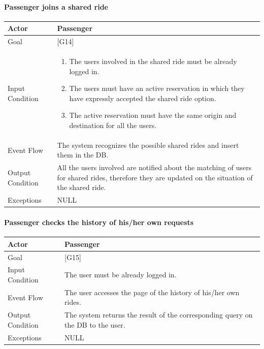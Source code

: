 \documentclass[a4paper,11pt]{report} %
\begin{document}
	\pagebreak
	
	\paragraph{Passenger joins a shared ride}
	\begin{center}
		\begin{tabular}{| l | p{9cm} |}\hline
			Actor & Passenger\\\hline
			Goal & {[}G14{]} \\\hline
			Input Condition & \begin{enumerate}
				\item The users involved in the shared ride must be already logged in.
				\item The users must have an active reservation in which they have expressly accepted the shared ride option.
				\item The active reservation must have the same origin and destination for all the users.
			\end{enumerate}\\\hline
			Event Flow & The system recognizes the possible shared rides and insert them in the DB.\\\hline
			Output Condition & All the users involved are notified about the matching of users for shared rides, therefore they are updated on the situation of the shared ride.\\\hline
			Exceptions & NULL\\\hline
		\end{tabular}
	\end{center}	
	
	\pagebreak
	
	\paragraph{Passenger checks the history of his/her own requests}
	\begin{center}
		\begin{tabular}{| l | p{9cm} |}\hline
			Actor & Passenger\\\hline
			Goal & {[}G15{]} \\\hline
			Input Condition & The user must be already logged in.\\\hline
			Event Flow & The user accesses the page of the history of his/her own rides.\\\hline
			Output Condition & The system returns the result of the corresponding query on the DB to the user.\\\hline
			Exceptions & NULL\\\hline
		\end{tabular}
	\end{center}	
	
\end{document}
